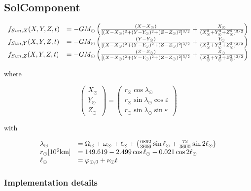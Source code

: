 \documentclass{article}
\begin{document}
\subsection{SolComponent}

\begin{equation}
\begin{array}{ll}
f_{Sun,X}(X,Y,Z,t) &=-G M_\odot\left(
{(X-X_\odot)\over [(X-X_\odot)^2+(Y-Y_\odot)^2+(Z-Z_\odot)^2]^{3/2}}
+{X_\odot\over(X_\odot^2+Y_\odot^2+Z_\odot^2)^{3/2}} \right)\\
f_{Sun,Y}(X,Y,Z,t) &=-G M_\odot\left(
{(Y-Y_\odot)\over [(X-X_\odot)^2+(Y-Y_\odot)^2+(Z-Z_\odot)^2]^{3/2}}
+{Y_\odot\over(X_\odot^2+Y_\odot^2+Z_\odot^2)^{3/2}} \right)\\
f_{Sun,Z}(X,Y,Z,t) &=-G M_\odot\left(
{(Z-Z_\odot)\over [(X-X_\odot)^2+(Y-Y_\odot)^2+(Z-Z_\odot)^2]^{3/2}}
+{Z_\odot\over(X_\odot^2+Y_\odot^2+Z_\odot^2)^{3/2}} \right)
\end{array}
\end{equation}

where

\begin{equation}
\begin{pmatrix}
X_\odot\\
Y_\odot\\
Z_\odot
\end{pmatrix} = \begin{pmatrix}
r_\odot \cos \lambda_\odot\\
r_\odot \sin \lambda_\odot \cos \varepsilon\\
r_\odot \sin \lambda_\odot \sin \varepsilon
\end{pmatrix}
\end{equation}

with

\begin{equation}
\begin{array}{ll}
\lambda_\odot &= \Omega_\odot+\omega_\odot+\ell_{\odot}+\left(
{6892\over3600} \sin \ell_{\odot} + {72\over 3600} \sin 2\ell_{\odot}\right)\\
r_\odot[10^6\mbox{km}] &=149.619-2.499 \cos \ell_{\odot} - 0.021 \cos 2\ell_{\odot}\\
\ell_{\odot} &= \varphi_{\odot,0}+\nu_\odot t
\end{array}
\end{equation}

\subsubsection{Implementation details}
\end{document}
